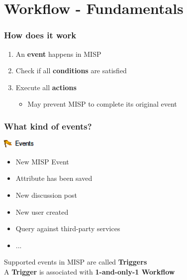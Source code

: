 \section{Workflow - Fundamentals}
\begin{frame}
    \frametitle{How does it work}
    \begin{center}
    \end{center}
    \begin{enumerate}
        \item An \textbf{event} happens in MISP
        \item Check if all \textbf{conditions} are satisfied
        \item Execute all \textbf{actions}
        \begin{itemize}
            \item May prevent MISP to complete its original event
        \end{itemize}
    \end{enumerate}
\end{frame}

\begin{frame}
    \frametitle{What kind of events?}
    \includegraphics[width=60px]{pictures/sc-event.png}
    \vspace*{0.5em}
    \begin{itemize}
        \item New MISP Event
        \item Attribute has been saved
        \item New discussion post
        \item New user created
        \item Query against third-party services
        \item ...
    \end{itemize}
    \vspace*{1em}
    {\Large {}} Supported events in MISP are called \textbf{Triggers}\\
    {\Large {}} A \textbf{Trigger} is associated with \textbf{1-and-only-1 Workflow}
\end{frame}

